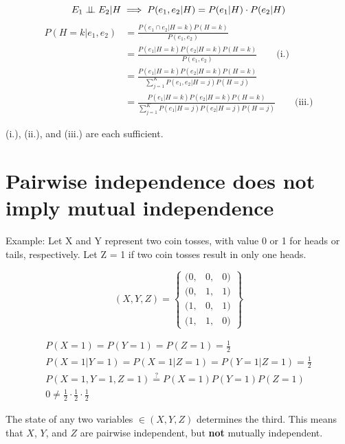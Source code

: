 \documentclass{article}
\begin{document}
\begin{equation*}
  E_1 \perp\!\!\!\perp E_2 | H \implies P(e_1,e_2|H) = P(e_1|H) \cdot P(e_2|H)
\end{equation*}
\begin{align*}
    P(H=k|e_1,e_2) &= \frac{P(e_1 \cap e_2|H=k)P(H=k)}{P(e_1,e_2)} \\
    &= \frac{P(e_1|H=k)P(e_2|H=k)P(H=k)}{P(e_1,e_2)} \qquad
    \text{(i.)} \\
    &= \frac{P(e_1|H=k)P(e_2|H=k)P(H=k)}{\sum\limits_{j=1}^K
      P(e_1,e_2|H=j)P(H=j)} \\
    &= \frac{P(e_1|H=k)P(e_2|H=k)P(H=k)}{\sum\limits_{j=1}^K
      P(e_1|H=j)P(e_2|H=j)P(H=j)} \qquad \text{(iii.)}
\end{align*}

(i.), (ii.), and (iii.) are each sufficient.

\section{Pairwise independence does not imply mutual independence}

Example: Let X and Y represent two coin tosses, with value 0 or 1 for
heads or tails, respectively. Let Z = 1 if two coin tosses result in
only one heads.

\[ (X, Y, Z) = \left\{
  \begin{array}{ccc}
    ( 0, & 0, & 0 ) \\
    (0, & 1, & 1) \\
    (1, & 0, & 1) \\ 
    (1, & 1, & 0)
  \end{array}
\right\}
\]

\begin{gather*}
  P(X=1) = P(Y=1) = P(Z=1) = \frac{1}{2} \\
  P(X=1|Y=1) = P(X=1|Z=1) = P(Y=1|Z=1) = \frac{1}{2} \\
  P(X=1,Y=1,Z=1) \stackrel{?}{=} P(X=1)P(Y=1)P(Z=1) \\
  0 \neq \frac{1}{2} \cdot \frac{1}{2} \cdot \frac{1}{2}
\end{gather*}

The state of any two variables $\in (X, Y, Z)$ determines the third.
This means that $X$, $Y$, and $Z$ are pairwise independent, but
\textbf{not} mutually independent.
\end{document}
